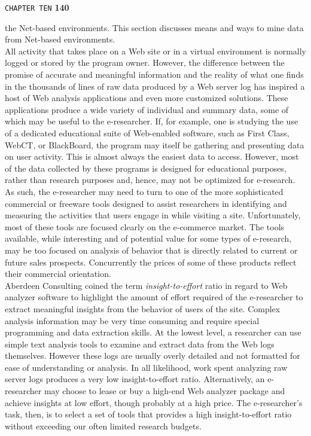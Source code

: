 \documentclass{book}
\begin{document}
\begin{flushleft}
\texttt{CHAPTER TEN}
\hspace*{0.5cm}
\textbf{140}
\end{flushleft}
the Net-based environments. This section discusses means and ways to mine data from Net-based environments.
\\\hspace*{0.5cm}All activity that takes place on a Web site or in a virtual environment is normally logged or stored by the program owner. However, the difference between the promise of accurate and meaningful information and the reality of what one finds in the thousands of lines of raw data produced by a Web server log has inspired a host of Web analysis applications and even more customized solutions. These applications produce a wide variety of individual and summary data, some of which may be useful to the e-researcher. If, for example, one is studying the use of a dedicated educational suite of Web-enabled software, such as First Class, WebCT, or BlackBoard, the program may itself be gathering and presenting data on user activity. This is almost always the easiest data to access. However, most of the data collected by these programs is designed for educational purposes, rather than research purposes and, hence, may not be optimized for e-research. As such, the e-researcher may need to turn to one of the more sophisticated commercial or freeware tools designed to assist researchers in identifying and measuring the activities that users engage in while visiting a site. Unfortunately, most of these tools are focused clearly on the e-commerce market. The tools available, while interesting and of potential value for some types of e-research, may be too focused on analysis of behavior that is directly related to current or future sales prospects. Concurrently the prices of some of these products reflect their commercial orientation.
\\\hspace*{0.5cm}Aberdeen Consulting coined the term \emph{insight-to-effort} ratio in regard to Web analyzer software to highlight the amount of effort required of the e-researcher to extract meaningful insights from the behavior of users of the site. Complex analysis information may be very time consuming and require special programming and data extraction skills. At the lowest level, a researcher can use simple text analysis tools to examine and extract data from the Web logs themselves. However these logs are usually overly detailed and not formatted for ease of understanding or analysis. In all likelihood, work spent analyzing raw server logs produces a very low insight-to-effort ratio. Alternatively, an e-researcher may choose to lease or buy a high-end Web analyzer package and achieve insights at low effort, though probably at a high price. The e-researcher's task, then, is to select a set of tools that provides a high insight-to-effort ratio without exceeding our often limited research budgets.
\end{document}
